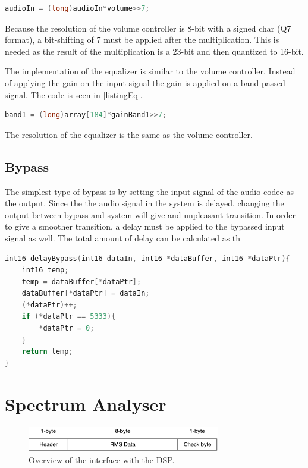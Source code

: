 \begin{lstlisting}[language=C, caption = {Gain adjustment in DSP},label={listingVolume}]
audioIn = (long)audioIn*volume>>7;
\end{lstlisting}

Because the resolution of the volume controller is 8-bit with a signed char (Q7 format), a bit-shifting of 7 must be applied after the multiplication. This is needed as the result of the multiplication is a 23-bit and then quantized to 16-bit.

The implementation of the equalizer is similar to the volume controller. Instead of applying the gain on the input signal the gain is applied on a band-passed signal. The code is seen in \autoref{listingEq}.

\begin{lstlisting}[language=C, caption = {Gain adjustment in DSP},label={listingEq}]
band1 = (long)array[184]*gainBand1>>7;
\end{lstlisting}

The resolution of the equalizer is the same as the volume controller. 

\subsection*{Bypass}
The simplest type of bypass is by setting the input signal of the audio codec as the output. Since the the audio signal in the system is delayed, changing the output between bypass and system will give and unpleasant transition. In order to give a smoother transition, a delay must be applied to the bypassed input signal as well. The total amount of delay can be calculated as th 

\begin{lstlisting}[language=C, caption = {Delay function for bypass},label={listingByPass}]
int16 delayBypass(int16 dataIn, int16 *dataBuffer, int16 *dataPtr){
	int16 temp;
	temp = dataBuffer[*dataPtr];
	dataBuffer[*dataPtr] = dataIn;
	(*dataPtr)++;
	if (*dataPtr == 5333){
		*dataPtr = 0;
	}
	return temp;
}
\end{lstlisting}

\section{Spectrum Analyser}

\begin{figure}[H]
\centering
\includegraphics[width=0.75\textwidth]{figures/communicationProtocolUARTTransmit.pdf}
\caption{Overview of the interface with the DSP.}
\label{fig:communicationProtocolUARTTransmit}
\end{figure}


